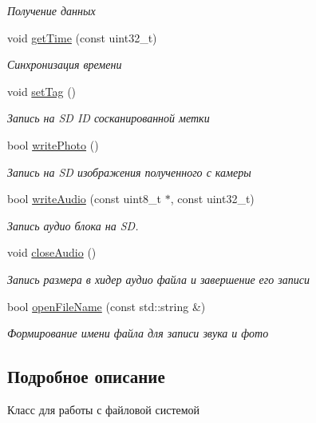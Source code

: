 \begin{DoxyCompactItemize}
\begin{DoxyCompactList}\small\item\em Получение данных \end{DoxyCompactList}\item 
void \hyperlink{classunit_1_1_t_file_system_a7a1adfdfb63b2071937f1c87b53a2d7e}{get\+Time} (const uint32\+\_\+t)
\begin{DoxyCompactList}\small\item\em Синхронизация времени \end{DoxyCompactList}\item 
void \hyperlink{classunit_1_1_t_file_system_a79523b2edca3574ec6254af671f28256}{set\+Tag} ()
\begin{DoxyCompactList}\small\item\em Запись на SD ID сосканированной метки \end{DoxyCompactList}\item 
bool \hyperlink{classunit_1_1_t_file_system_aacd7aae1827432b04c06b9a1d440b949}{write\+Photo} ()
\begin{DoxyCompactList}\small\item\em Запись на SD изображения полученного с камеры \end{DoxyCompactList}\item 
bool \hyperlink{classunit_1_1_t_file_system_a01199e9b6421790c5954dbc69ef84ae2}{write\+Audio} (const uint8\+\_\+t $\ast$, const uint32\+\_\+t)
\begin{DoxyCompactList}\small\item\em Запись аудио блока на SD. \end{DoxyCompactList}\item 
void \hyperlink{classunit_1_1_t_file_system_ae30e2668ef7405051b427660fa866302}{close\+Audio} ()
\begin{DoxyCompactList}\small\item\em Запись размера в хидер аудио файла и завершение его записи \end{DoxyCompactList}\item 
bool \hyperlink{classunit_1_1_t_file_system_a80f8d844c27c27cb5998b2d2214d041a}{open\+File\+Name} (const std\+::string \&)
\begin{DoxyCompactList}\small\item\em Формирование имени файла для записи звука и фото \end{DoxyCompactList}\end{DoxyCompactItemize}


\subsection{Подробное описание}
Класс для работы с файловой системой 

